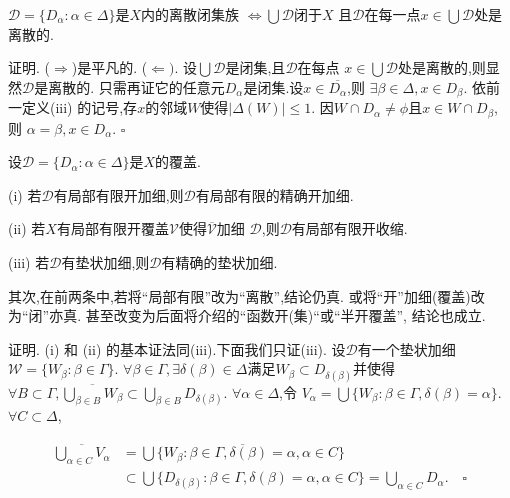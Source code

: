 \documentclass[main.tex]{subfiles}
\begin{document}
\begin{fact}
$\mathscr{D}=\{D_\alpha: \alpha\in \Delta\}$是$X$内的离散闭集族
$\Leftrightarrow\bigcup\mathscr{D}$闭于$X$ 
且$\mathscr{D}$在每一点$x\in\bigcup\mathscr{D}$处是离散的.
\end{fact}
证明. ($\Rightarrow$)是平凡的.
($\Leftarrow)$. 设$\bigcup\mathscr{D}$是闭集,且$\mathscr{D}$在每点
$x\in\bigcup\mathscr{D}$处是离散的,则显然$\mathscr{D}$是离散的.
只需再证它的任意元$D_\alpha$是闭集.设$x\in\overline{D_\alpha}$,则
$\exists\beta\in\Delta, x\in D_\beta$.
依前一定义(iii) 的记号,存$x$的邻域$W$使得$|\Delta(W)|\le 1$. 
因$W\cap D_\alpha \ne \phi$且$x\in W\cap D_\beta$, 则
$\alpha = \beta, x\in D_\alpha$.
$\square$

\begin{fact}
设$\mathscr{D}=\{D_\alpha: \alpha\in \Delta\}$是$X$的覆盖.

\textnormal{(i)} 若$\mathscr{D}$有局部有限开加细,则$\mathscr{D}$有局部有限的精确开加细.

\textnormal{(ii)} 若$X$有局部有限开覆盖$\mathscr{V}$使得$\mathscr{\overline{V}}$加细
$\mathscr{D}$,则$\mathscr{D}$有局部有限开收缩.

\textnormal{(iii)} 若$\mathscr{D}$有垫状加细,则$\mathscr{D}$有精确的垫状加细.

其次,在前两条中,若将“局部有限”改为“离散”,结论仍真.
或将“开”加细\textnormal{(}覆盖\textnormal{)}改为“闭”亦真.
甚至改变为后面将介绍的“函数开\textnormal{(}集\textnormal{)}“或“半开覆盖”,
结论也成立.
\end{fact}

证明. (i) 和 (ii) 的基本证法同(iii).下面我们只证(iii).
设$\mathscr{D}$有一个垫状加细$\mathscr{W}=\{W_\beta: \beta\in\Gamma\}$.
$\forall\beta\in\Gamma,\exists \delta(\beta)\in \Delta$满足$W_\beta\subset D_{\delta(\beta)}$并使得
$\forall B\subset\Gamma, \overline{\bigcup_{\beta\in B}W_\beta}\subset 
	\bigcup_{\beta\in B}D_{\delta(\beta)}$.
$\forall \alpha\in \Delta$,令
$V_\alpha=\bigcup\{W_\beta: \beta\in\Gamma, \delta(\beta) = \alpha\}$.
$\forall C\subset\Delta$,

\begin{equation}
\begin{aligned}
\overline{\bigcup_{\alpha\in C}V_\alpha}
	&= \overline{\bigcup \{W_\beta: \beta\in\Gamma, \delta(\beta)=\alpha, \alpha\in C\}}   \\
	&\subset\bigcup \{D_{\delta(\beta)}: \beta\in\Gamma, \delta(\beta)=\alpha, \alpha\in C\} = \bigcup_{\alpha\in C}D_\alpha. \quad\square
\end{aligned}
\end{equation}
\end{document}

